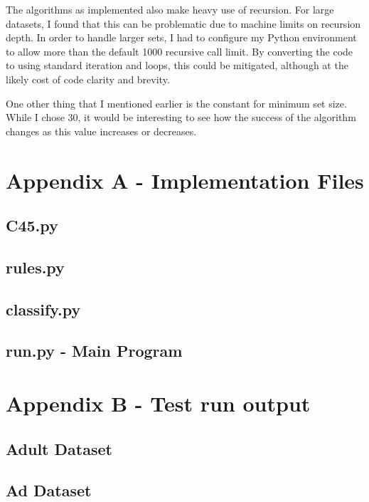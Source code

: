 \documentclass[letterpaper]{article}
\begin{document}
The algorithms as implemented also make heavy use of recursion. For 
large datasets, I found that this can be problematic due to machine limits on 
recursion depth. In order to handle larger sets, I had to configure my Python 
environment to allow more than the default 1000 recursive call limit. 
By converting the code to using standard iteration and loops, this could 
be mitigated, although at the likely cost of code clarity and brevity.

One other thing that I mentioned earlier is the constant for minimum set size.
While I chose 30, it would be interesting to see how the success of the algorithm changes 
as this value increases or decreases.

\onecolumn
\newpage
\section{Appendix A - Implementation Files}
\subsection{C45.py}

\subsection{rules.py}

\subsection{classify.py}

\subsection{run.py - Main Program}


\newpage
\section{Appendix B - Test run output}
\subsection{Adult Dataset}

\subsection{Ad Dataset}

\end{document}
